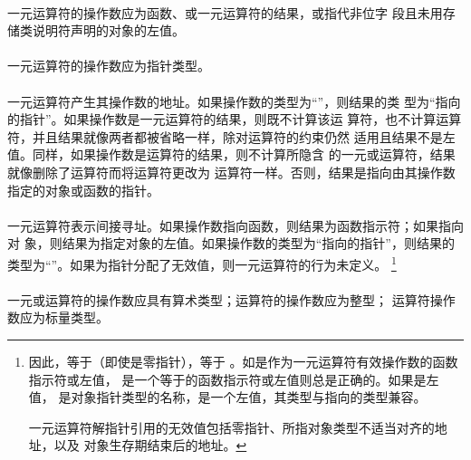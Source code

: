 {

\constraint
\paragraph{}
一元运算符\tm{\&}的操作数应为函数、\tm{[]}或一元\tm{*}运算符的结果，或指代非位字
段且未用存储类说明符声明的对象的左值。

\paragraph{}
一元\tm{*}运算符的操作数应为指针类型。

\semantic
\paragraph{}
一元运算符\tm{\&}产生其操作数的地址。如果操作数的类型为``''，则结果的类
型为``指向的指针''。如果操作数是一元\tm{*}运算符的结果，则既不计算该运
算符，也不计算\tm{\&}运算符，并且结果就像两者都被省略一样，除对运算符的约束仍然
适用且结果不是左值。同样，如果操作数是\tm{[]}运算符的结果，则不计算\tm{[]}所隐含
的一元\tm{\&}或\tm{*}运算符，结果就像删除了\tm{\&}运算符而将\tm{[]}运算符更改为
\tm{+}运算符一样。否则，结果是指向由其操作数指定的对象或函数的指针。

\paragraph{}
一元\tm{*}运算符表示间接寻址。如果操作数指向函数，则结果为函数指示符；如果指向对
象，则结果为指定对象的左值。如果操作数的类型为``指向的指针''，则结果的
类型为``''。如果为指针分配了无效值，则一元\tm{*}运算符的行为未定义。
\footnote{因此，等于（即使是零指针），等于
。如是作为一元\tm{\&}运算符有效操作数的函数指示符或左值，
是一个等于的函数指示符或左值则总是正确的。如果是左值，
是对象指针类型的名称，是一个左值，其类型与指向的类型兼容。

一元\tm{*}运算符解指针引用的无效值包括零指针、所指对象类型不适当对齐的地址，以及
对象生存期结束后的地址。}


\constraint
\paragraph{}
一元\tm{+}或\tm{-}运算符的操作数应具有算术类型；\tm{\~}运算符的操作数应为整型；
\tm{!}运算符操作数应为标量类型。

}
